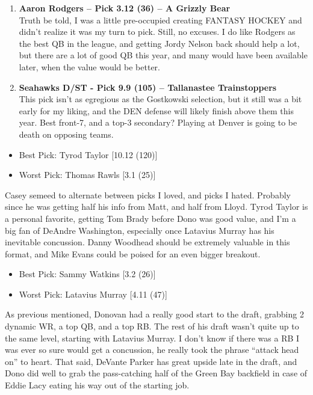\documentclass[11pt,letterpaper]{article}
\begin{document}
\begin{enumerate}
\item \textbf{Aaron Rodgers -- Pick 3.12 (36) -- A Grizzly Bear}
\\Truth be told, I was a little pre-occupied creating FANTASY HOCKEY and didn't realize it was my turn to pick. Still, no excuses. I do like Rodgers as the best QB in the league, and getting Jordy Nelson back should help a lot, but there are a lot of good QB this year, and many would have been available later, when the value would be better.

\item \textbf{Seahawks D/ST - Pick 9.9 (105) -- Tallanastee Trainstoppers}
\\This pick isn't as egregious as the Gostkowski selection, but it still was a bit early for my liking, and the DEN defense will likely finish above them this year. Best front-7,  and a top-3 secondary? Playing at Denver is going to be death on opposing teams.
\end{enumerate}

\newpage
{}
\begin{itemize}
\item Best Pick: Tyrod Taylor [10.12 (120)]
\item Worst Pick: Thomas Rawls [3.1 (25)]
\end{itemize}
Casey semeed to alternate between picks I loved, and picks I hated. Probably since he was getting half his info from Matt, and half from Lloyd. Tyrod Taylor is a personal favorite, getting Tom Brady before Dono was good value, and I'm a big fan of DeAndre Washington, especially once Latavius Murray has his inevitable concussion. Danny Woodhead should be extremely valuable in this format, and Mike Evans could be poised for an even bigger breakout.

\begin{itemize}
\item Best Pick: Sammy Watkins [3.2 (26)]
\item Worst Pick: Latavius Murray [4.11 (47)]
\end{itemize}
As previous mentioned, Donovan had a really good start to the draft, grabbing 2 dynamic WR, a top QB, and a top RB. The rest of his draft wasn't quite up to the same level, starting with Latavius Murray. I don't know if there was a RB I was ever so sure would get a concussion, he really took the phrase ``attack head on'' to heart. That said, DeVante Parker has great upside late in the draft, and Dono did well to grab the pass-catching half of the Green Bay backfield in case of Eddie Lacy eating his way out of the starting job.
\end{document}
